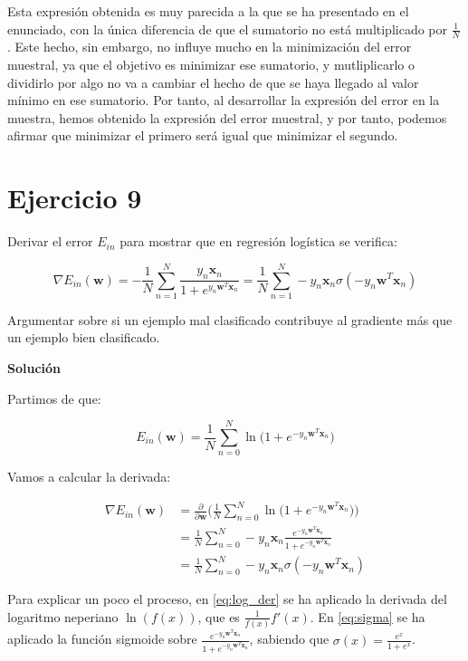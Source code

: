 \documentclass[11pt,a4paper]{article}
\newcommand{\answer}{\noindent\textbf{Solución}}
\begin{document}
Esta expresión obtenida es muy parecida a la que se ha presentado en el enunciado, con la única diferencia de que el sumatorio
no está multiplicado por $\frac{1}{N}$. Este hecho, sin embargo, no influye mucho en la minimización del error muestral,
ya que el objetivo es minimizar ese sumatorio, y mutliplicarlo o dividirlo por algo no va a cambiar el hecho de que
se haya llegado al valor mínimo en ese sumatorio. Por tanto, al desarrollar la expresión del error en la muestra, hemos
obtenido la expresión del error muestral, y por tanto, podemos afirmar que minimizar el primero será igual que minimizar el
segundo.

\section*{Ejercicio 9}

\noindent Derivar el error $E_{in}$ para mostrar que en regresión logística se verifica:

\[\nabla E_{in}(\mathbf{w}) = -\frac{1}{N} \sum_{n=1}^N \frac{y_n\mathbf{x}_n}{1 +
e^{y_n\mathbf{w}^T\mathbf{x}_n}} =
\frac{1}{N} \sum_{n=1}^N -y_n \mathbf{x}_n \sigma (-y_n\mathbf{w}^T\mathbf{x}_n)
\]

\noindent Argumentar sobre si un ejemplo mal clasificado contribuye al gradiente más que un ejemplo bien clasificado.

\answer

Partimos de que:

\begin{equation}
	E_{in}(\textbf{w}) = \frac{1}{N} \displaystyle \sum_{n=0}^N \ln\Big(1 + e^{-y_n\mathbf{w}^T\mathbf{x}_n}\Big)
\end{equation}

Vamos a calcular la derivada:


\begin{align}
	\nabla E_{in}(\mathbf{w}) &= \frac{\partial}{\partial \mathbf{w}} \bigg( \frac{1}{N}	\displaystyle \sum_{n=0}^N 
	\ln\Big(1 + e^{-y_n\mathbf{w}^T\mathbf{x}_n}\Big) \bigg) \\
	&= \frac{1}{N} \displaystyle \sum_{n=0}^N
	-y_n\mathbf{x}_n \frac{e^{-y_n\mathbf{w}^T\mathbf{x}_n}}{1 + e^{-y_n\mathbf{w}^T\mathbf{x}_n}} \label{eq:log_der}\\ 
	&= \frac{1}{N} \displaystyle \sum_{n=0}^N 
	-y_n\mathbf{x}_n \sigma (-y_n\mathbf{w}^T\mathbf{x}_n) \label{eq:sigma}
\end{align}

Para explicar un poco el proceso, en \eqref{eq:log_der} se ha aplicado la derivada del logaritmo neperiano $\ln(f(x))$,
que es $\frac{1}{f(x)}f'(x)$. En \eqref{eq:sigma} se ha aplicado la función sigmoide sobre
$\frac{e^{-y_n\mathbf{w}^T\mathbf{x}_n}}{1 + e^{-y_n\mathbf{w}^T\mathbf{x}_n}}$, sabiendo que
$\sigma(x) = \frac{e^x}{1 + e^x}$.
\end{document}
